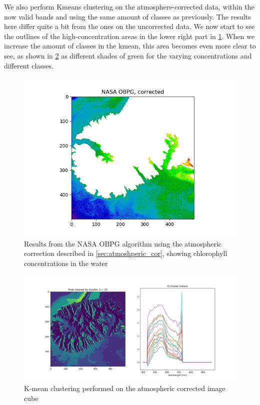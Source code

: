 We also perform Kmeans clustering on the atmosphere-corrected data, within the now 
valid bands and using the same amount of classes as previously. 
The results here differ quite a bit from the ones on the uncorrected data. We now 
start to see the outlines of the high-concentration areas in the lower right part 
in \cref{fig:obpg_corrected}. When we increase the amount of classes in the kmean, 
this area becomes even more clear to see, as shown in \cref{fig:kmean_corrected} 
as different shades of green for the varying concentrations and different classes.


\begin{figure}
    \centering
    \includegraphics[width=\textwidth]{../fig/NASA OBPG, corrected.png}
    \caption{Results from the NASA OBPG algorithm using the atmospheric correction described 
    in \cref{sec:atmoshperic_cor}, showing chlorophyll concentrations in the water}
    \label{fig:obpg_corrected}
\end{figure}


\begin{figure}
    \centering
    \includegraphics[width=\textwidth]{../fig/kmean/kmean_corrected15.png}
    \caption{K-mean clustering performed on the atmospheric corrected image cube}
    \label{fig:kmean_corrected}
\end{figure}




